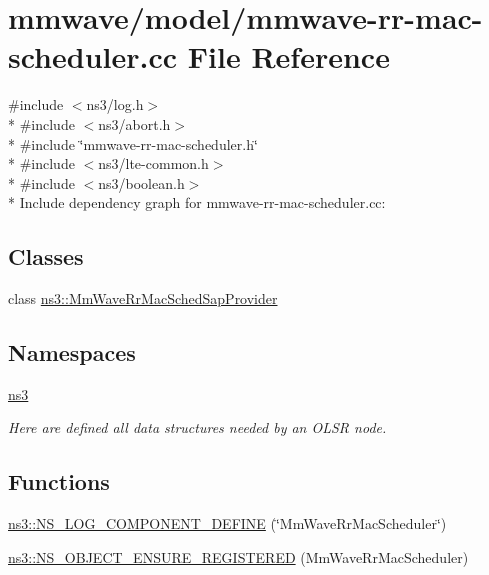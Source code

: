 \hypertarget{mmwave-rr-mac-scheduler_8cc}{}\section{mmwave/model/mmwave-\/rr-\/mac-\/scheduler.cc File Reference}
\label{mmwave-rr-mac-scheduler_8cc}
{\ttfamily \#include $<$ns3/log.\+h$>$}\\*
{\ttfamily \#include $<$ns3/abort.\+h$>$}\\*
{\ttfamily \#include \char`\"{}mmwave-\/rr-\/mac-\/scheduler.\+h\char`\"{}}\\*
{\ttfamily \#include $<$ns3/lte-\/common.\+h$>$}\\*
{\ttfamily \#include $<$ns3/boolean.\+h$>$}\\*
Include dependency graph for mmwave-\/rr-\/mac-\/scheduler.cc\+:
\subsection*{Classes}
\begin{DoxyCompactItemize}
\item 
class \hyperlink{classns3_1_1MmWaveRrMacSchedSapProvider}{ns3\+::\+Mm\+Wave\+Rr\+Mac\+Sched\+Sap\+Provider}
\end{DoxyCompactItemize}
\subsection*{Namespaces}
\begin{DoxyCompactItemize}
\item 
 \hyperlink{namespacens3}{ns3}
\begin{DoxyCompactList}\small\item\em Here are defined all data structures needed by an O\+L\+SR node. \end{DoxyCompactList}\end{DoxyCompactItemize}
\subsection*{Functions}
\begin{DoxyCompactItemize}
\item 
\hyperlink{namespacens3_a369d09fad203fd3b10c6a1e6f718eeea}{ns3\+::\+N\+S\+\_\+\+L\+O\+G\+\_\+\+C\+O\+M\+P\+O\+N\+E\+N\+T\+\_\+\+D\+E\+F\+I\+NE} (\char`\"{}Mm\+Wave\+Rr\+Mac\+Scheduler\char`\"{})
\item 
\hyperlink{namespacens3_a39a450cbb14577e7b1491171bfd44725}{ns3\+::\+N\+S\+\_\+\+O\+B\+J\+E\+C\+T\+\_\+\+E\+N\+S\+U\+R\+E\+\_\+\+R\+E\+G\+I\+S\+T\+E\+R\+ED} (Mm\+Wave\+Rr\+Mac\+Scheduler)
\end{DoxyCompactItemize}
